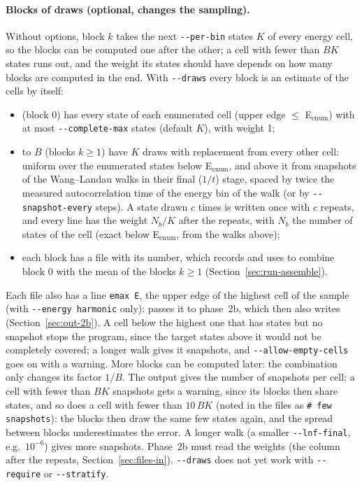 \paragraph{Blocks of draws (optional, changes the sampling).} Without
options, block $k$ takes the next \texttt{-{}-per-bin} states $K$ of every
energy cell, so the blocks can be computed one after the other; a cell
with fewer than $B K$ states runs out, and the weight its states should
have depends on how many blocks are computed in the end. With
\texttt{-{}-draws} every block is an estimate of the cells by itself:
\begin{itemize}
\item {} (block 0) has every state of each
  enumerated cell (upper edge $\le$ E$_\mathrm{enum}$) with at most
  \texttt{-{}-complete-max} states (default $K$), with weight 1;
\item {} to $B$ (blocks
  $k \ge 1$) have $K$ draws with replacement from every other cell:
  uniform over the enumerated states below E$_\mathrm{enum}$, and above it
  from snapshots of the Wang--Landau walks in their final ($1/t$) stage,
  spaced by twice the measured autocorrelation time of the energy bin of
  the walk (or by \texttt{-{}-snapshot-every} steps). A state drawn $c$
  times is written once with $c$ repeats, and every line has the weight
  $N_b/K$ after the repeats, with $N_b$ the number of states of the cell
  (exact below E$_\mathrm{enum}$, from the walks above);
\item each block has a file  with
  its number, which  records and 
  uses to combine block 0 with the mean of the blocks $k \ge 1$
  (Section~\ref{sec:run-assemble}).
\end{itemize}
Each  file also has a line \texttt{emax E}, the upper edge
of the highest cell of the sample (with \texttt{-{}-energy harmonic}
only):  passes it to phase~2b, which then also writes
 (Section~\ref{sec:out-2b}). A cell below the highest
one that has states but no snapshot stops the program, since the target
states above it would not be completely covered; a longer walk gives it
snapshots, and \texttt{-{}-allow-empty-cells} goes on with a warning.
More blocks can be computed later: the combination only changes its
factor $1/B$. The output gives the number of snapshots per cell; a cell
with fewer than $B K$ snapshots gets a warning, since its blocks then
share states, and so does a cell with fewer than $10\,B K$ (noted in the
 files as \texttt{\# few snapshots}): the blocks then draw
the same few states again, and the spread between blocks underestimates
the error. A longer walk (a smaller \texttt{-{}-lnf-final}, e.g.\
$10^{-6}$) gives more snapshots. Phase~2b must read the weights (the
column after the repeats, Section~\ref{sec:files-in}). \texttt{-{}-draws}
does not yet work with \texttt{-{}-require} or \texttt{-{}-stratify}.

